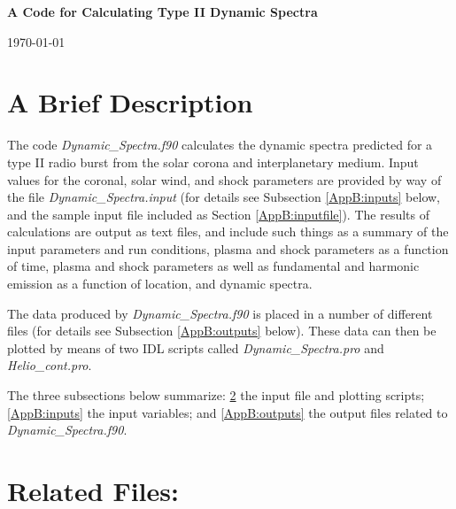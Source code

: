 \documentclass[12pt,a4paper]{article}
\begin{document}
 
 
\newlength{\temptextwidth} 

\begin{center}
{\Huge\bf A Code for Calculating Type II Dynamic Spectra}
 
 \vspace{1cm}
 
 \today
 
 \vspace{1cm}
\end{center}


%
\section{A Brief Description}
 The code {\it Dynamic\_Spectra.f90} calculates the  dynamic  spectra 
 predicted for a type II radio burst from the solar corona and
 interplanetary medium. Input values for the coronal, solar wind, and
 shock parameters are provided by way of the file {\it Dynamic\_Spectra.input}
 (for details see Subsection \ref{AppB:inputs} below, and the sample 
 input file included as Section \ref{AppB:inputfile}). The results
 of calculations are output as text files, and  include such things as
 a summary of the input parameters and run conditions, plasma and shock 
 parameters as a function of time, plasma and shock parameters as well as 
 fundamental and harmonic emission as a function of location, and 
 dynamic spectra.
 
 The data produced by {\it Dynamic\_Spectra.f90} is placed in a number of 
 different files (for details see Subsection \ref{AppB:outputs} below). 
 These data can then be plotted by means of two IDL scripts called  
 {\it Dynamic\_Spectra.pro} and {\it Helio\_cont.pro}.
 
 The three subsections below summarize: \ref{AppB:relatedfiles} the input
 file and plotting scripts;  \ref{AppB:inputs} the input variables; and 
 \ref{AppB:outputs} the output files related to {\it Dynamic\_Spectra.f90}.
 

\section{Related Files:}\label{AppB:relatedfiles} 


 \setlength{\temptextwidth}{\textwidth}  
 \addtolength{\temptextwidth}{-1.0\parindent}
  
\end{document}
